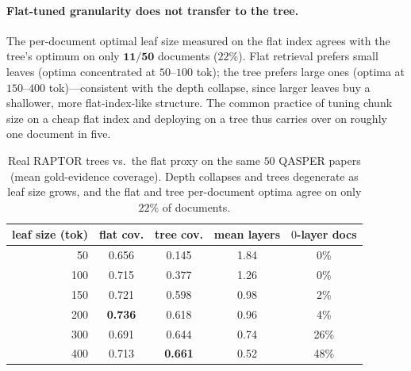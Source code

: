 \documentclass[11pt]{article}
\begin{document}
\paragraph{Flat-tuned granularity does not transfer to the tree.} The per-document optimal leaf
size measured on the flat index agrees with the tree's optimum on only $\mathbf{11/50}$ documents
(\textbf{$22\%$}). Flat retrieval prefers small leaves (optima concentrated at $50$--$100$ tok);
the tree prefers large ones (optima at $150$--$400$ tok)---consistent with the depth collapse,
since larger leaves buy a shallower, more flat-index-like structure. The common practice of
tuning chunk size on a cheap flat index and deploying on a tree thus carries over on roughly one
document in five.

\begin{table}[t]
\centering
\caption{Real RAPTOR trees vs.\ the flat proxy on the same $50$ QASPER papers (mean gold-evidence
coverage). Depth collapses and trees degenerate as leaf size grows, and the flat and tree
per-document optima agree on only $22\%$ of documents.}
\label{tab:realtree}
\begin{tabular}{rcccc}
\toprule
leaf size (tok) & flat cov. & tree cov. & mean layers & $0$-layer docs \\
\midrule
50  & 0.656 & 0.145 & 1.84 & \phantom{0}0\% \\
100 & 0.715 & 0.377 & 1.26 & \phantom{0}0\% \\
150 & 0.721 & 0.598 & 0.98 & \phantom{0}2\% \\
200 & \textbf{0.736} & 0.618 & 0.96 & \phantom{0}4\% \\
300 & 0.691 & 0.644 & 0.74 & 26\% \\
400 & 0.713 & \textbf{0.661} & 0.52 & 48\% \\
\bottomrule
\end{tabular}
\end{table}
\end{document}
